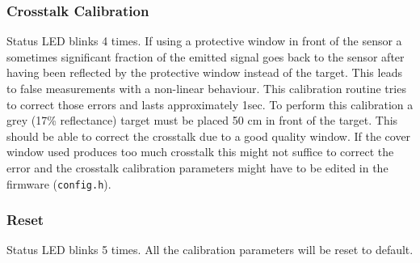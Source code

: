 \begin{multicols}{2}
\subsubsection{Crosstalk Calibration}
Status LED blinks 4 times.
If using a protective window in front of the sensor a sometimes significant fraction of the emitted signal goes back to the sensor after having been reflected by the protective window instead of the target. This leads to false measurements with a non-linear behaviour.
This calibration routine tries to correct those errors and lasts approximately 1sec. To perform this calibration a grey (17\% reflectance) target must be placed 50 cm in front of the target. This should be able to correct the crosstalk due to a good quality window. If the cover window used produces too much crosstalk this might not suffice to correct the error and the crosstalk calibration parameters might have to be edited in the firmware (\texttt{config.h}).

\subsubsection{Reset}
Status LED blinks 5 times.
All the calibration parameters will be reset to default.
\end{multicols}
\begingroup
